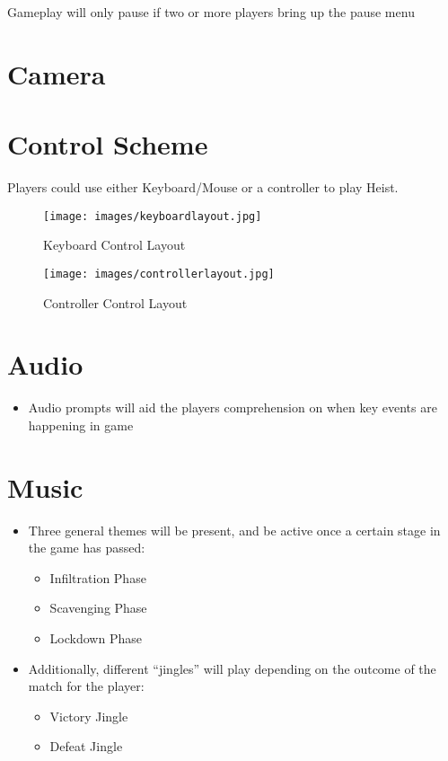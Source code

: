 \documentclass[11pt]{report}
\begin{document}
Gameplay will only pause if two or more players bring up the pause menu


\section{Camera}


\section{Control Scheme}

Players could use either Keyboard/Mouse or a controller to play Heist.

\begin{figure}[H]
	\texttt{[image: images/keyboardlayout.jpg]}
    \caption{Keyboard Control Layout}
\end{figure}

\begin{figure}[H]
	\texttt{[image: images/controllerlayout.jpg]}
    \caption{Controller Control Layout}
\end{figure}

\section{Audio}

\begin{itemize}
    \item Audio prompts will aid the players comprehension on when key events are happening in game
\end{itemize}

\section{Music}

\begin{itemize}
    \item Three general themes will be present, and be active once a certain stage in the game has passed:
    \begin{itemize}
        \item Infiltration Phase
        \item Scavenging Phase
        \item Lockdown Phase
    \end{itemize}
    \item Additionally, different “jingles” will play depending on the outcome of the match for the player:
    \begin{itemize}
        \item Victory Jingle
        \item Defeat Jingle
    \end{itemize}
\end{itemize}
\end{document}
